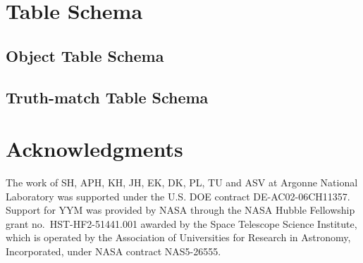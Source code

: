 \documentclass[modern]{descnote}
\begin{document}
\clearpage

\section{Table Schema}

\subsection{Object Table Schema}
\label{app:object-schema}


\bigskip

\subsection{Truth-match Table Schema}
\label{app:truth-schema}



\clearpage
\section*{Acknowledgments}
{}



The work of SH, APH, KH, JH, EK, DK, PL, TU and ASV at Argonne National Laboratory was supported under the U.S. DOE contract DE-AC02-06CH11357.
Support for YYM was provided by NASA through the NASA Hubble Fellowship grant no.\ HST-HF2-51441.001 awarded by the Space Telescope Science Institute, which is operated by the Association of Universities for Research in Astronomy, Incorporated, under NASA contract NAS5-26555. 

\end{document}
